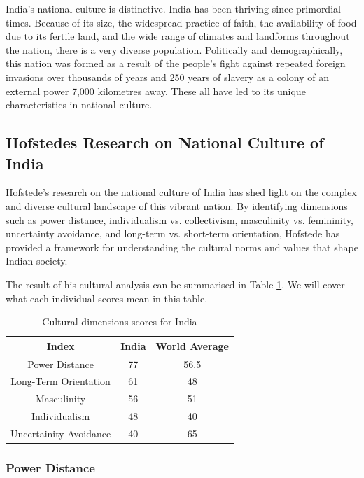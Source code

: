 \documentclass[12pt]{article}
\begin{document}
India's national culture is distinctive. India has been thriving since primordial times. Because of its size, the widespread practice of faith, the availability of food due to its fertile land, and the wide range of climates and landforms throughout the nation, there is a very diverse population. Politically and demographically, this nation was formed as a result of the people's fight against repeated foreign invasions over thousands of years and 250 years of slavery as a colony of an external power 7,000 kilometres away. These all have led to its unique characteristics in national culture.

\subsection{Hofstedes Research on National Culture of India}

Hofstede's research on the national culture of India\cite{ref:Hofstede's research on the national culture of India} has shed light on the complex and diverse cultural landscape of this vibrant nation. By identifying dimensions such as power distance, individualism vs. collectivism, masculinity vs. femininity, uncertainty avoidance, and long-term vs. short-term orientation, Hofstede has provided a framework for understanding the cultural norms and values that shape Indian society.

The result of his cultural analysis can be summarised in Table \ref{Table 1}. We will cover what each individual scores mean in this table.

\begin{table}
    \begin{center}
    \begin{tabular}{|c|c|c|}
        \hline
        Index & India & World Average \\
        \hline
        Power Distance & 77 & 56.5 \\
        Long-Term Orientation & 61 & 48 \\
        Masculinity & 56 & 51 \\
        Individualism & 48 & 40 \\
        Uncertainity Avoidance & 40 & 65 \\
        \hline
    \end{tabular}
    \caption{Cultural dimensions scores for India}
    \label{Table 1}
    \end{center}
\end{table}

\subsubsection{Power Distance}
\end{document}
